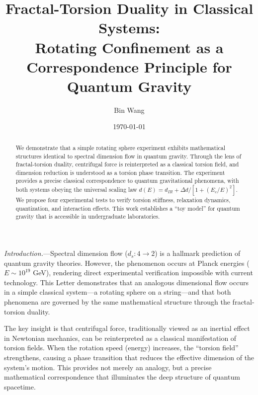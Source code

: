 \documentclass[aps,prl,twocolumn,superscriptaddress,floatfix]{revtex4-2}
\begin{document}
\title{Fractal-Torsion Duality in Classical Systems: \\ Rotating Confinement as a Correspondence Principle for Quantum Gravity}

\author{Bin Wang}

\date{\today}

\begin{abstract}
We demonstrate that a simple rotating sphere experiment exhibits mathematical structures identical to spectral dimension flow in quantum gravity. Through the lens of fractal-torsion duality, centrifugal force is reinterpreted as a classical torsion field, and dimension reduction is understood as a torsion phase transition. The experiment provides a precise classical correspondence to quantum gravitational phenomena, with both systems obeying the universal scaling law $d(E) = d_{IR} + \Delta d/[1+(E_c/E)^2]$. We propose four experimental tests to verify torsion stiffness, relaxation dynamics, quantization, and interaction effects. This work establishes a ``toy model'' for quantum gravity that is accessible in undergraduate laboratories.
\end{abstract}

\maketitle

\textit{Introduction.}---Spectral dimension flow ($d_s: 4 \to 2$) is a hallmark prediction of quantum gravity theories\cite{carlip2005,reuter2006}. However, the phenomenon occurs at Planck energies ($E \sim 10^{19}$ GeV), rendering direct experimental verification impossible with current technology. This Letter demonstrates that an analogous dimensional flow occurs in a simple classical system---a rotating sphere on a string---and that both phenomena are governed by the same mathematical structure through the fractal-torsion duality\cite{wang2026}.

The key insight is that centrifugal force, traditionally viewed as an inertial effect in Newtonian mechanics, can be reinterpreted as a classical manifestation of torsion fields. When the rotation speed (energy) increases, the ``torsion field'' strengthens, causing a phase transition that reduces the effective dimension of the system's motion. This provides not merely an analogy, but a precise mathematical correspondence that illuminates the deep structure of quantum spacetime.
\end{document}
